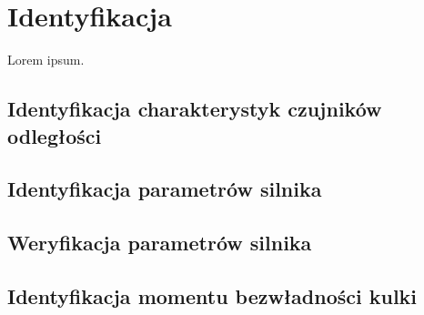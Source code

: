\chapter{Identyfikacja}
\label{cha:ch6_identyfikacja}

Lorem ipsum.

\section{Identyfikacja charakterystyk czujników odległości}
\label{sec:ch6_identyfikacja_charakterystyk_czujnikow}

\section{Identyfikacja parametrów silnika}
\label{sec:ch6_identyfikacja_parametrow_silnika}

\section{Weryfikacja parametrów silnika}
\label{sec:ch6_weryfikacja_parametrow_silnika}

\section{Identyfikacja momentu bezwładności kulki}
\label{sec:ch6_identyfikacja_bezwladnosci_kulki}

